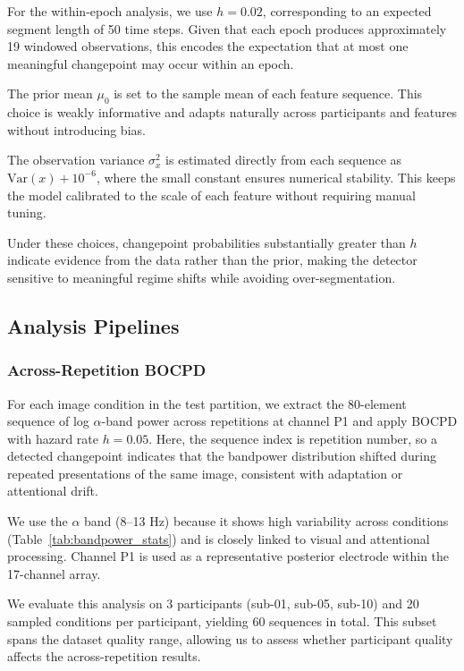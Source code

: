 \documentclass[11pt,letterpaper]{article}
\begin{document}
For the within-epoch analysis, we use $h = 0.02$, corresponding to an expected segment length of 50 time steps. Given that each epoch produces approximately 19 windowed observations, this encodes the expectation that at most one meaningful changepoint may occur within an epoch.

The prior mean $\mu_0$ is set to the sample mean of each feature sequence. This choice is weakly informative and adapts naturally across participants and features without introducing bias.

The observation variance $\sigma_x^2$ is estimated directly from each sequence as $\mathrm{Var}(x) + 10^{-6}$, where the small constant ensures numerical stability. This keeps the model calibrated to the scale of each feature without requiring manual tuning.

Under these choices, changepoint probabilities substantially greater than $h$ indicate evidence from the data rather than the prior, making the detector sensitive to meaningful regime shifts while avoiding over-segmentation.

\subsection{Analysis Pipelines}

\subsubsection{Across-Repetition BOCPD}

For each image condition in the test partition, we extract the 80-element sequence of log $\alpha$-band power across repetitions at channel P1 and apply BOCPD with hazard rate $h = 0.05$. Here, the sequence index is repetition number, so a detected changepoint indicates that the bandpower distribution shifted during repeated presentations of the same image, consistent with adaptation or attentional drift.

We use the $\alpha$ band (8--13 Hz) because it shows high variability across conditions (Table~\ref{tab:bandpower_stats}) and is closely linked to visual and attentional processing. Channel P1 is used as a representative posterior electrode within the 17-channel array.

We evaluate this analysis on 3 participants (sub-01, sub-05, sub-10) and 20 sampled conditions per participant, yielding 60 sequences in total. This subset spans the dataset quality range, allowing us to assess whether participant quality affects the across-repetition results.
\end{document}
